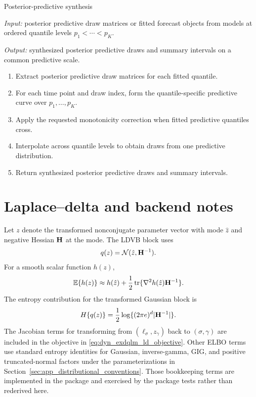 \begin{appalgorithm}{Posterior-predictive synthesis}
\label{alg:predictive-synthesis}
\par\noindent\emph{Input:} posterior predictive draw matrices or fitted
forecast objects from models at ordered quantile levels
$p_1<\cdots<p_K$.
\par\noindent\emph{Output:} synthesized posterior predictive draws and
summary intervals on a common predictive scale.
\begin{enumerate}[label=(\arabic*)]
\item Extract posterior predictive draw matrices for each fitted quantile.
\item For each time point and draw index, form the quantile-specific
predictive curve over $p_1,\ldots,p_K$.
\item Apply the requested monotonicity correction when fitted predictive
quantiles cross.
\item Interpolate across quantile levels to obtain draws from one predictive
distribution.
\item Return synthesized posterior predictive draws and summary intervals.
\end{enumerate}
\end{appalgorithm}

\section{Laplace--delta and backend notes}
\label{sec:numerical_blocks}

Let $z$ denote the transformed nonconjugate parameter vector with mode
$\hat z$ and negative Hessian $\mathbf{H}$ at the mode. The LDVB block uses
\begin{equation}
q(z)=\mathcal{N}(\hat z,\mathbf{H}^{-1}).
\label{eq:ld_gaussian}
\end{equation}
For a smooth scalar function $h(z)$,
\begin{equation}
\mathbb{E}\{h(z)\}
\approx
h(\hat z)
+\frac{1}{2}\operatorname{tr}\{\nabla^2h(\hat z)\mathbf{H}^{-1}\}.
\label{eq:delta_generic}
\end{equation}
The entropy contribution for the transformed Gaussian block is
\begin{equation}
H\{q(z)\}
=
\frac{1}{2}\log\{(2\pi e)^d|\mathbf{H}^{-1}|\}.
\label{eq:entropy_ld}
\end{equation}
The Jacobian terms for transforming from $(\ell_\sigma,z_\gamma)$ back to
$(\sigma,\gamma)$ are included in the objective in
\eqref{eq:dyn_exdqlm_ld_objective}. Other ELBO terms use standard entropy
identities for Gaussian, inverse-gamma, GIG, and positive truncated-normal
factors under the parameterizations in
Section~\ref{sec:app_distributional_conventions}. Those bookkeeping terms are
implemented in the package and exercised by the package tests rather than
rederived here.

